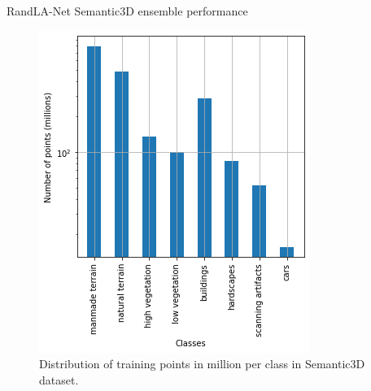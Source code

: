 \documentclass[aspectratio=169]{beamer}
\begin{document}
\begin{frame}{RandLA-Net Semantic3D ensemble performance}
    \begin{figure}[h!]
        \centering
        \includegraphics[scale=0.4]{theme/images/distribution.png}
        \caption{Distribution of training points in million per class in Semantic3D dataset.}
        \label{fig:sem3ddist}
    \end{figure}
\end{frame}
\end{document}
